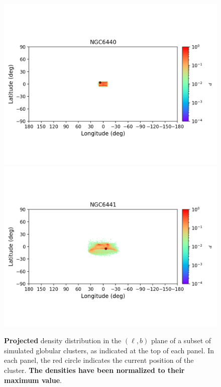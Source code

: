 \begin{figure}
        \includegraphics[clip=true, trim = 0mm 20mm 0mm 10mm, width=1\columnwidth]{images/error_plots_NGC6440.png}
        \includegraphics[clip=true, trim = 0mm 20mm 0mm 10mm, width=1\columnwidth]{images/error_plots_NGC6441.png}
        \caption[]{\textbf{Projected} density distribution in the $(\ell, b)$ plane of a subset of simulated globular clusters, as indicated at the top of each panel. In each panel, the red circle indicates the current position of the cluster. \textbf{The densities have been normalized to their maximum value}.}\label{stream11}
        \end{figure}
